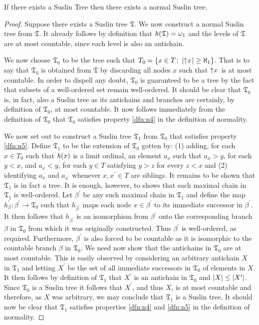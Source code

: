 \begin{lem}
	If there exists a Suslin Tree then there exists a normal Suslin tree.
\end{lem}
\begin{proof}
	Suppose there exists a Suslin tree $\mathfrak{T}$.  We now construct a normal Suslin tree from $\mathfrak{T}$.  It already follows by definition that $\mathit{h}(\mathfrak{T})=\omega_1$ and the levels of $\mathfrak{T}$ are at most countable, since each level is also an antichain.

	We now choose $\mathfrak{T}_0$ to be the tree such that $T_0=\lbrace x\in T\colon \left\lvert\left\uparrow x\right.\right\rvert\geq\aleph_1 \rbrace$.  That is to say that $\mathfrak{T}_0$ is obtained from $\mathfrak{T}$ by discarding all nodes $x$ such that $\left\uparrow x\right.$ is at most countable.  In order to dispell any doubt, $\mathfrak{T}_0$ is guaranteed to be a tree by the fact that subsets of a well-ordered set remain well-ordered.  It should be clear that $\mathfrak{T}_0$ is, in fact, also a Suslin tree as its antichains and branches are certainly, by definition of $\mathfrak{T}_0$, at most countable.  It now follows immediately from the definition of $\mathfrak{T}_0$ that $\mathfrak{T}_0$ satisfies property \ref{dfn:n4} in the definition of normality.

	We now set out to construct a Suslin tree $\mathfrak{T}_1$ from $\mathfrak{T}_0$ that satisfies property \ref{dfn:n5}.  Define $\mathfrak{T}_1$ to be the extension of $\mathfrak{T}_0$ gotten by: (1) adding, for each $x\in T_0$ such that $\mathit{h}(x)$ is a limit ordinal, an element $a_x$ such that $a_x>y$, for  each $y<x$, and $a_x<y$, for each $y\in T$ satisfying $y>z$ for every $z<x$ and (2) identifying $a_x$ and $a_{x^\prime}$ whenever $x,x^\prime\in T$ are siblings.  It remains to be shown that $\mathfrak{T}_1$ is in fact a tree.  It is enough, however, to shows that each maximal chain in $\mathfrak{T}_1$ is well-ordered.  Let $\beta^\prime$ be any such maximal chain in $\mathfrak{T}_1$ and define the map $h_\beta^\prime\colon\beta^\prime\to\mathfrak{T}_0$ such that $h_{\beta^\prime}$ maps each node $x\in\beta^\prime$ to its immediate successor in $\beta^\prime$.  It then follows that $h_{\beta^\prime}$ is an isomorphism from $\beta^\prime$ onto the corresponding branch $\beta$ in $\mathfrak{T}_0$ from which it was originally constructed.  Thus $\beta^\prime$ is well-ordered, as required.  Furthermore, $\beta^\prime$ is also forced to be countable as it is isomorphic to the countable branch $\beta$ in $\mathfrak{T}_0$.  We need now show that the antichains in $\mathfrak{T}_0$ are at most countable.  This is easily observed by considering an arbitrary antichain $X$ in $\mathfrak{T}_1$ and letting $X^\prime$ be the set of all immediate successors in $\mathfrak{T}_0$ of elements in $X$.  It then follows by definition of $\mathfrak{T}_1$ that $X^\prime$ is an antichain in $\mathfrak{T}_0$ and $\left\lvert X\right\rvert\leq\left\lvert X^\prime\right\rvert$.  Since $\mathfrak{T}_0$ is a Suslin tree it follows that $X^\prime$, and thus $X$, is at most countable and therefore, as $X$ was arbitrary, we may conclude that $\mathfrak{T}_1$ is a Suslin tree.  It should now be clear that $\mathfrak{T}_1$ satisfies properties \ref{dfn:n4} and \ref{dfn:n5} in the definition of normality.


\end{proof}
